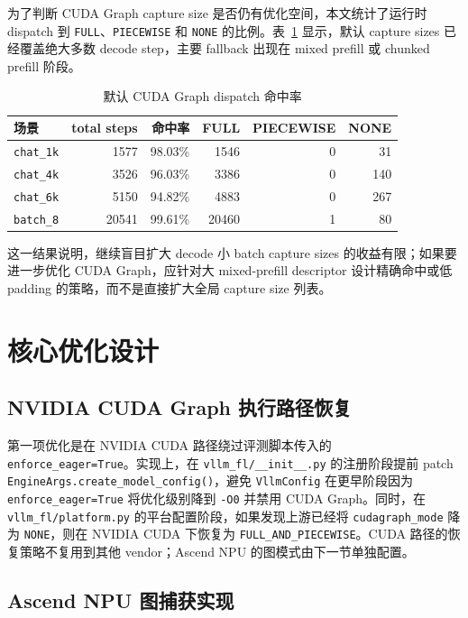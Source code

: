 \documentclass[UTF8,10.5pt]{ctexart}
\newcommand{\code}[1]{\texttt{#1}}
\begin{document}
为了判断 CUDA Graph capture size 是否仍有优化空间，本文统计了运行时 dispatch 到 \code{FULL}、\code{PIECEWISE} 和 \code{NONE} 的比例。表~\ref{tab:cg-hit} 显示，默认 capture sizes 已经覆盖绝大多数 decode step，主要 fallback 出现在 mixed prefill 或 chunked prefill 阶段。

\begin{table}[H]
\centering
\caption{默认 CUDA Graph dispatch 命中率}
\label{tab:cg-hit}
\begin{tabular}{lrrrrr}
\toprule
场景 & total steps & 命中率 & FULL & PIECEWISE & NONE \\
\midrule
\code{chat\_1k} & 1577 & 98.03\% & 1546 & 0 & 31 \\
\code{chat\_4k} & 3526 & 96.03\% & 3386 & 0 & 140 \\
\code{chat\_6k} & 5150 & 94.82\% & 4883 & 0 & 267 \\
\code{batch\_8} & 20541 & 99.61\% & 20460 & 1 & 80 \\
\bottomrule
\end{tabular}
\end{table}

这一结果说明，继续盲目扩大 decode 小 batch capture sizes 的收益有限；如果要进一步优化 CUDA Graph，应针对大 mixed-prefill descriptor 设计精确命中或低 padding 的策略，而不是直接扩大全局 capture size 列表。

\section{核心优化设计}

\subsection{NVIDIA CUDA Graph 执行路径恢复}

第一项优化是在 NVIDIA CUDA 路径绕过评测脚本传入的 \code{enforce\_eager=True}。实现上，在 \code{vllm\_fl/\_\_init\_\_.py} 的注册阶段提前 patch \code{EngineArgs.create\_model\_config()}，避免 \code{VllmConfig} 在更早阶段因为 \code{enforce\_eager=True} 将优化级别降到 \code{-O0} 并禁用 CUDA Graph。同时，在 \code{vllm\_fl/platform.py} 的平台配置阶段，如果发现上游已经将 \code{cudagraph\_mode} 降为 \code{NONE}，则在 NVIDIA CUDA 下恢复为 \code{FULL\_AND\_PIECEWISE}。CUDA 路径的恢复策略不复用到其他 vendor；Ascend NPU 的图模式由下一节单独配置。

\subsection{Ascend NPU 图捕获实现}
\end{document}
